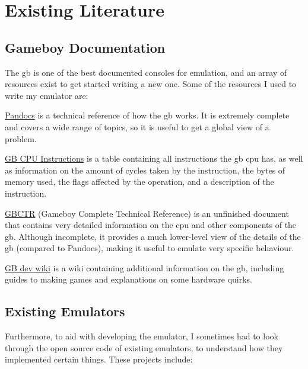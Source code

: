 \documentclass[11pt]{report}
\begin{document}
\section{Existing Literature}

\subsection{Gameboy Documentation}

The \glsdesc{gb} is one of the best documented consoles for emulation, and an array of resources exist to get started writing a new one. Some of the resources I used to write my emulator are:

\begin{compactitem}
    \item \href{https://gbdev.io/pandocs/}{Pandocs} is a technical reference of how the \gls{gb} works. It is extremely complete and covers a wide range of topics, so it is useful to get a global view of a problem.
    \item \href{https://meganesu.github.io/generate-gb-opcodes/}{GB CPU Instructions} is a table containing all instructions the \gls{gb} \gls{cpu} has, as well as information on the amount of cycles taken by the instruction, the bytes of memory used, the flags affected by the operation, and a description of the instruction.
    \item \href{https://gekkio.fi/files/gb-docs/gbctr.pdf}{GBCTR} (Gameboy Complete Technical Reference) is an unfinished document that contains very detailed information on the \gls{cpu} and other components of the \gls{gb}. Although incomplete, it provides a much lower-level view of the details of the \gls{gb} (compared to Pandocs), making it useful to emulate very specific behaviour.
    \item \href{https://gbdev.gg8.se/wiki/}{GB dev wiki} is a wiki containing additional information on the \gls{gb}, including guides to making games and explanations on some hardware quirks.
\end{compactitem}

\subsection{Existing Emulators}

Furthermore, to aid with developing the emulator, I sometimes had to look through the open source code of existing emulators, to understand how they implemented certain things. These projects include:
\end{document}
